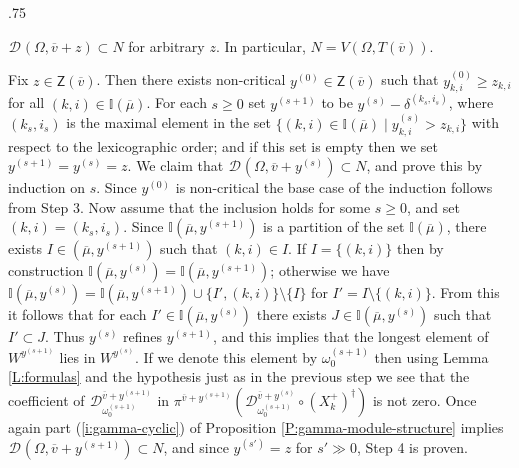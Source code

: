 \documentclass[11pt,fleqn]{amsart}
\makeatletter
\renewcommand\proofname{Proof}
\renewenvironment{proof}[1][\textit{\proofname}]{\par
 \pushQED{\qed}%
 \normalfont \topsep.75\paraskip\relax
 \trivlist
 \item[\hskip\labelsep
 \itshape
 #1\@addpunct{.}]\ignorespaces
}{%
 \popQED\endtrivlist\@endpefalse
}
\newcounter{para}[section]
\newcommand\II{\mathbb I}
\newcommand\DD[3]{{}^{#1} \mathcal D_{#2}^{#3}}
\newcommand\Z{\mathsf Z}
\newcommand\vv{\overline{v}}
\makeatother
\begin{document}
\begin{proof}
$\DD{}{}{}(\Omega, \vv + z) \subset N$ for arbitrary $z$. In particular, $N = 
V(\Omega, T(\vv))$.

Fix  $z \in \Z(\vv)$. Then there exists  non-critical $y^{(0)} \in 
\Z(\vv)$ such that $y^{(0)}_{k,i} \geq z_{k,i}$ for all $(k,i)
\in \II(\overline \mu)$. For each $s \geq 0$ set $y^{(s+1)}$ to be 
$y^{(s)} - \delta^{(k_s, i_s)}$, where $(k_s, i_s)$ is the maximal element
in the set $\{(k,i) \in \II(\overline \mu) \mid y^{(s)}_{k,i} > z_{k,i}\}$
with respect to the lexicographic order; and if this set is empty then we set 
$y^{(s+1)} = y^{(s)} = z$. We claim that $\DD{}{}{}(\Omega, \vv + y^{(s)}) 
\subset N$, and prove this by induction on $s$. Since $y^{(0)}$ is non-critical
the base case of the induction follows from Step 3. Now assume that the 
inclusion holds for some $s \geq 0$, and set $(k,i) = (k_s, i_s)$. Since 
$\II(\overline \mu, y^{(s+1)})$ is a partition of the set $\II(\overline \mu)$,
there exists $I \in (\overline \mu, y^{(s+1)})$ such that $(k,i) \in I$. 
If $I = \{(k,i)\}$ then by construction $\II(\overline \mu, y^{(s)}) = 
\II(\overline \mu, y^{(s+1)})$; otherwise we have $\II(\overline \mu, y^{(s)}) = \II(\overline \mu, y^{(s+1)}) \cup \{I',
(k,i)\}\setminus \{I\}$ for $I' = I \setminus \{(k,i)\}$. From this it follows that for each $I' \in 
\II(\overline \mu, y^{(s)})$ there exists $J \in \II(\overline \mu, y^{(s)})$
such that $I' \subset J$. Thus $y^{(s)}$ refines $y^{(s+1)}$, and this implies 
that the longest element of $W^{y^{(s+1)}}$ lies in $W^{y^{(s)}}$. If we 
denote this element by $\omega_0^{(s+1)}$ then using Lemma \ref{L:formulas} 
and the hypothesis just as in the previous step we see that the coefficient of 
$\DD{}{\omega_0^{(s+1)}}{\vv + y^{(s+1)}}$ in $\pi^{\vv + 
y^{(s+1)}}\left(\DD{}{\omega_0^{(s+1)}}{\vv + y^{(s)}} \circ (X_k^{+})^\dagger 
\right)$ is not zero. Once again part 
(\ref{i:gamma-cyclic}) of Proposition \ref{P:gamma-module-structure} implies 
$\DD{}{}{}(\Omega, \vv + y^{(s+1)}) \subset N$, and since $y^{(s')} = z$ for 
$s' \gg 0$, Step 4 is proven.
\end{proof}
\end{document}
